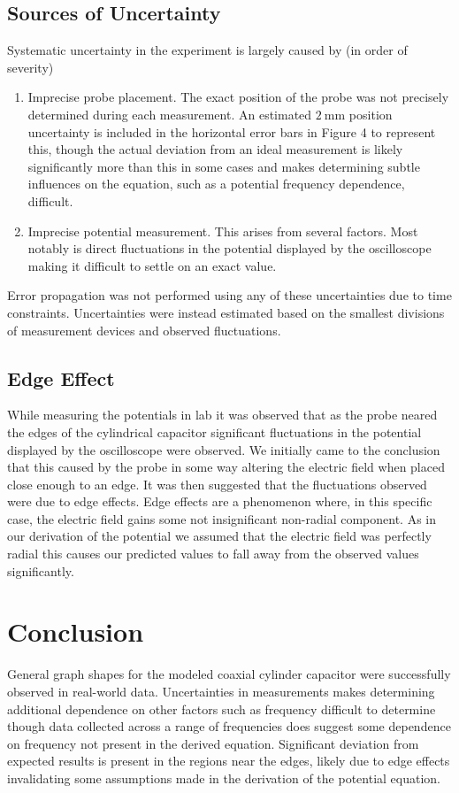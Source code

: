 \documentclass[10pt, twocolumn]{article}
\theoremstyle{definition}
\begin{document}
\subsection{Sources of Uncertainty}
Systematic uncertainty in the experiment is largely caused by (in order of severity)
\begin{enumerate}
  \item Imprecise probe placement. The exact position of the probe was not precisely determined during each measurement.
        An estimated $\qty{2}{\milli\meter}$ position uncertainty is included in the horizontal error bars in Figure 4
        to represent this, though the actual deviation from an ideal measurement is likely significantly more than this in some cases
        and makes determining subtle influences on the equation, such as a potential frequency dependence, difficult.
  \item Imprecise potential measurement. This arises from several factors. Most notably is direct fluctuations
        in the potential displayed by the oscilloscope making it difficult to settle on an exact value.
\end{enumerate}
Error propagation was not performed using any of these uncertainties due to time constraints. Uncertainties were instead estimated
based on the smallest divisions of measurement devices and observed fluctuations.
\subsection {Edge Effect}
While measuring the potentials in lab it was observed that as the probe neared the edges
of the cylindrical capacitor significant fluctuations in the potential displayed by the oscilloscope were observed.
We initially came to the conclusion that this caused
by the probe in some way altering the electric field when placed close enough to an edge.
It was then suggested that the fluctuations observed were due to edge effects. Edge effects are a phenomenon where,
in this specific case, the electric field gains some not insignificant non-radial component. As in our derivation
of the potential we assumed that the electric field was perfectly radial this causes our predicted values to fall away
from the observed values significantly.
\section{Conclusion}
General graph shapes for the modeled coaxial cylinder capacitor were successfully observed in real-world data. Uncertainties in measurements makes
determining additional dependence on other factors such as frequency difficult to determine though data collected across a range of frequencies
does suggest some dependence on frequency not present in the derived equation. Significant deviation from expected results is present in
the regions near the edges, likely due to edge effects invalidating some assumptions made in the derivation of the potential equation.
\end{document}
